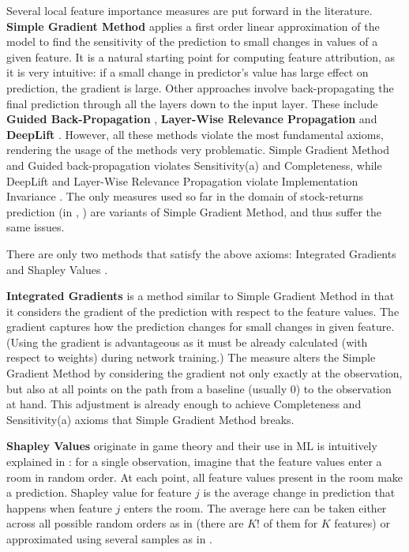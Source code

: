 			Several local feature importance measures are put forward in the literature. \textbf{Simple Gradient Method} \citep{baehrens2010explain} applies a first order linear approximation of the model to find the sensitivity of the prediction to small changes in values of a given feature. It is a natural starting point for computing feature attribution, as it is very intuitive: if a small change in predictor's value has large effect on prediction, the gradient is large. Other approaches involve back-propagating the final prediction through all the layers down to the input layer. These include  \textbf{Guided Back-Propagation} \citep{springenberg2014striving}, \textbf{Layer-Wise Relevance Propagation} \citep{binder2016layer} and \textbf{DeepLift} \citep{shrikumar2017learning}. However, all these methods violate the most fundamental axioms, rendering the usage of the methods very problematic. Simple Gradient Method and Guided back-propagation violates Sensitivity(a) and Completeness, while DeepLift and Layer-Wise Relevance Propagation violate Implementation Invariance \citep{shrikumar2017learning, sundararajan2017axiomatic}. The only measures used so far in the domain of stock-returns prediction (in \cite{gu2020empirical}, \cite{tobek2020does}) are variants of Simple Gradient Method, and thus suffer the same issues. 
			
			There are only two methods that satisfy the above axioms: Integrated Gradients \citep{sundararajan2017axiomatic} and Shapley Values \citep{shapley1971assignment}. 	
			
			\textbf{ Integrated Gradients} \citep{sundararajan2017axiomatic} is a method similar to Simple Gradient Method in that it considers the gradient of the prediction with respect to the feature values. The gradient captures how the prediction changes for small changes in given feature. (Using the gradient is advantageous as it must be already calculated (with respect to weights) during network training.) The measure alters the Simple Gradient Method by considering the gradient not only exactly at the observation, but also at all points on the path from a baseline (usually $0$) to the observation at hand. This adjustment is already enough to achieve Completeness and Sensitivity(a) axioms that Simple Gradient Method breaks. 
			
			\textbf{Shapley Values} \citep{shapley1971assignment} originate in game theory and their use in ML is intuitively explained in \cite{molnar2020interpretable}: for a single observation, imagine that the feature values enter a room in random order. At each point, all feature values present in the room make a prediction. Shapley value for feature $j$ is the average change in prediction that happens when feature $j$ enters the room. The average here can be taken either across all possible random orders as in \cite{shapley1971assignment} (there are $K!$ of them for $K$ features) or approximated using several samples as in \cite{vstrumbelj2014explaining}. 
			
